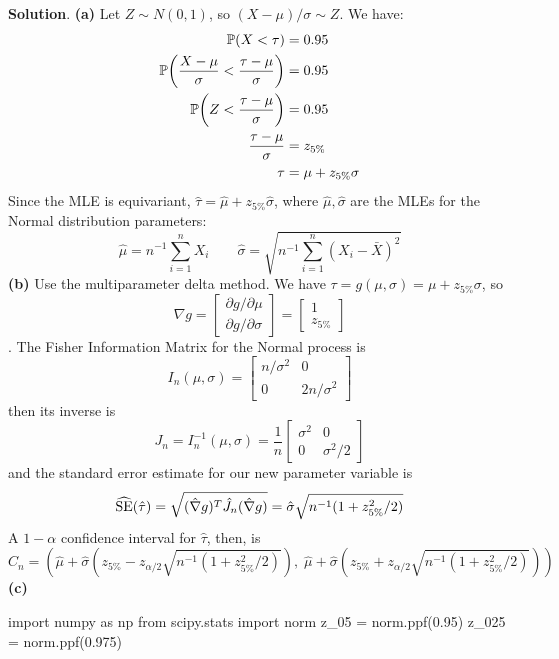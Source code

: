 \textbf{Solution}.
\textbf{(a)}
Let \(Z \sim N(0, 1)\), so \((X - \mu) / \sigma \sim Z\). We have:
\begin{align*}
\PROB(X < \tau) &= 0.95 \\
\PROB\left(\frac{X - \mu}{\sigma} < \frac{\tau - \mu}{\sigma}\right) &= 0.95 \\
\PROB\left(Z < \frac{\tau - \mu}{\sigma}\right) &= 0.95 \\
\frac{\tau - \mu}{\sigma} &= z_{5\%} \\
\tau &= \mu + z_{5\%} \sigma 
\end{align*}
Since the MLE is equivariant,
\(\hat{\tau} = \hat{\mu} + z_{5\%} \hat{\sigma}\), where
\(\hat{\mu}, \hat{\sigma}\) are the MLEs for the Normal distribution
parameters:
\[
\hat{\mu} = n^{-1} \sum_{i=1}^{n} X_{i}
\quad \quad
\hat{\sigma} = \sqrt{n^{-1} \sum_{i=1}^{n} (X_{i} - \bar{X})^{2}}
\]
\textbf{(b)}
Use the multiparameter delta method.
We have \(\tau = g(\mu, \sigma) = \mu + z_{5\%} \sigma\), so
\[
\nabla g = \begin{bmatrix}
\partial g / \partial \mu \\
\partial g / \partial \sigma
\end{bmatrix}
= \begin{bmatrix}
1 \\
z_{5\%}
\end{bmatrix}
\].
The Fisher Information Matrix for the Normal process is
\[
I_{n}(\mu, \sigma) = \begin{bmatrix}
n / \sigma^{2} & 0 \\
0 & 2n / \sigma^{2}
\end{bmatrix}
\]
then its inverse is
\[
J_{n} = I_{n}^{-1}(\mu, \sigma) = \frac{1}{n} \begin{bmatrix}
\sigma^{2} & 0 \\
0 & \sigma^{2}/2
\end{bmatrix}
\]
and the standard error estimate for our new parameter variable is
\[
\widehat{\operatorname{\mathrm{SE}}}(\hat{\tau}) = \sqrt{(\hat{\nabla} g)^T \hat{J}_{n} (\hat{\nabla} g)} = \hat{\sigma} \sqrt{n^{-1}(1 + z_{5\%}^{2} / 2)}
\]
A \(1 - \alpha\) confidence interval for \(\hat{\tau}\), then, is
\[
C_{n} = \left(
\hat{\mu} + \hat{\sigma}\left( z_{5\%} - z_{\alpha / 2} \sqrt{n^{-1}(1 + z_{5\%}^{2} / 2)} \right), \;
\hat{\mu} + \hat{\sigma}\left( z_{5\%} + z_{\alpha / 2} \sqrt{n^{-1}(1 + z_{5\%}^{2} / 2)} \right) \right)
\]
\textbf{(c)}

\begin{python}
import numpy as np
from scipy.stats import norm
z_05 = norm.ppf(0.95)
z_025 = norm.ppf(0.975)
\end{python}

